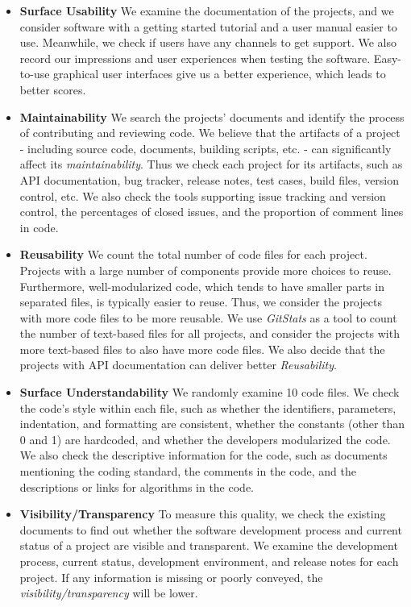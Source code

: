 \begin{itemize}
\item \textbf{Surface Usability} We examine the documentation of the projects, and we consider software with a getting started tutorial and a user manual easier to use. Meanwhile, we check if users have any channels to get support. We also record our impressions and user experiences when testing the software. Easy-to-use graphical user interfaces give us a better experience, which leads to better scores.

\item \textbf{Maintainability} We search the projects' documents and identify the process of contributing and reviewing code. We believe that the artifacts of a project - including source code, documents, building scripts, etc. - can significantly affect its  \textit{maintainability}. Thus we check each project for its artifacts, such as API documentation, bug tracker, release notes, test cases, build files, version control, etc. We also check the tools supporting issue tracking and version control, the percentages of closed issues, and the proportion of comment lines in code.

\item \textbf{Reusability} We count the total number of code files for each project. Projects with a large number of components provide more choices to reuse. Furthermore, well-modularized code, which tends to have smaller parts in separated files, is typically easier to reuse. Thus, we consider the projects with more code files to be more reusable. We use \textit{GitStats} as a tool to count the number of text-based files for all projects, and consider the projects with more text-based files to also have more code files. We also decide that the projects with API documentation can deliver better \textit{Reusability}.

\item \textbf{Surface Understandability} We randomly examine 10 code files. We check the code’s style within each file, such as whether the identifiers, parameters, indentation, and formatting are consistent, whether the constants (other than 0 and 1) are hardcoded, and whether the developers modularized the code. We also check the descriptive information for the code, such as documents mentioning the coding standard, the comments in the code, and the descriptions or links for algorithms in the code. 

\item \textbf{Visibility/Transparency} To measure this quality, we check the existing documents to find out whether the software development process and current status of a project are visible and transparent. We examine the development process, current status, development environment, and release notes for each project. If any information is missing or poorly conveyed, the \textit{visibility/transparency} will be lower.
\end{itemize}

